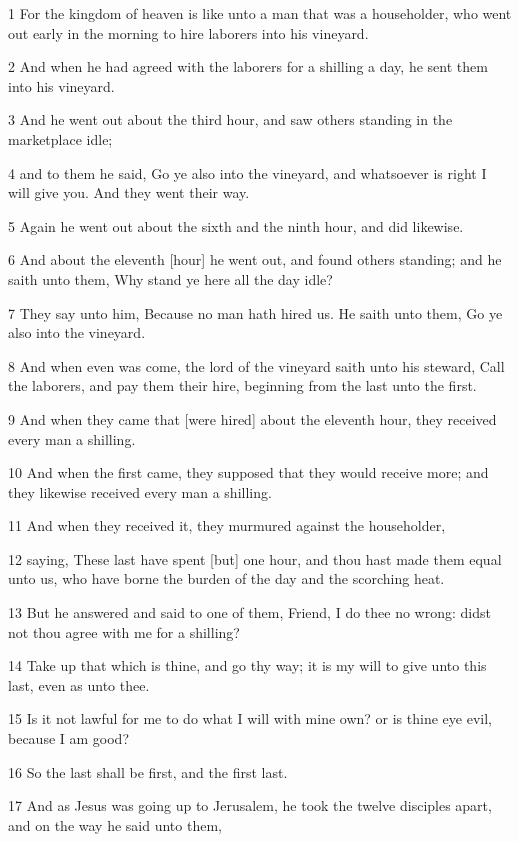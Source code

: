 \par 1 For the kingdom of heaven is like unto a man that was a householder, who went out early in the morning to hire laborers into his vineyard.
\par 2 And when he had agreed with the laborers for a shilling a day, he sent them into his vineyard.
\par 3 And he went out about the third hour, and saw others standing in the marketplace idle;
\par 4 and to them he said, Go ye also into the vineyard, and whatsoever is right I will give you. And they went their way.
\par 5 Again he went out about the sixth and the ninth hour, and did likewise.
\par 6 And about the eleventh [hour] he went out, and found others standing; and he saith unto them, Why stand ye here all the day idle?
\par 7 They say unto him, Because no man hath hired us. He saith unto them, Go ye also into the vineyard.
\par 8 And when even was come, the lord of the vineyard saith unto his steward, Call the laborers, and pay them their hire, beginning from the last unto the first.
\par 9 And when they came that [were hired] about the eleventh hour, they received every man a shilling.
\par 10 And when the first came, they supposed that they would receive more; and they likewise received every man a shilling.
\par 11 And when they received it, they murmured against the householder,
\par 12 saying, These last have spent [but] one hour, and thou hast made them equal unto us, who have borne the burden of the day and the scorching heat.
\par 13 But he answered and said to one of them, Friend, I do thee no wrong: didst not thou agree with me for a shilling?
\par 14 Take up that which is thine, and go thy way; it is my will to give unto this last, even as unto thee.
\par 15 Is it not lawful for me to do what I will with mine own? or is thine eye evil, because I am good?
\par 16 So the last shall be first, and the first last.
\par 17 And as Jesus was going up to Jerusalem, he took the twelve disciples apart, and on the way he said unto them,

